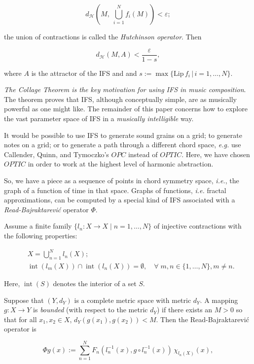 \documentclass[english,11pt,letterpaper,onecolumn]{scrartcl}
\numberwithin{equation}{section}
\newcommand{\st}{\,|\,}
\newcommand{\calH}{\mathcal{H}}
\newcommand{\Int}{\mathop{\mathrm{int}}}
\newcommand{\be}{\begin{equation}}
\newcommand{\ee}{\end{equation}}
\begin{document}
\be\label{hutchop}
d_\calH \left(M, \;\bigcup_{i=1}^N f_i (M) \right) < \varepsilon;
\ee

\noindent the union of contractions is called the \textit{Hutchinson operator}.
Then

\[
d_\calH (M, A) < \frac{\varepsilon}{1-s},
\]

\noindent where $A$ is the attractor of the IFS and  and $s :=
\max\{\mathrm{Lip}\,f_i\st
i = 1, \ldots, N\}$.

\textit{The Collage Theorem is the key motivation for using IFS in music
composition}. The theorem proves that IFS, although conceptually simple, are as
musically powerful as one might like. The remainder of this paper concerns how
to explore the vast parameter space of IFS in a \textit{musically intelligible}
way.

It would be possible to use IFS to generate sound grains on a grid; to generate
notes on a grid; or to generate a path through a different chord space,
\textit{e.g.} use Callender, Quinn, and Tymoczko's $OPC$ instead of $OPTIC$.
Here, we have chosen $OPTIC$ in order to work at the highest level of harmonic
abstraction.

So, we have a piece as a sequence of points in chord symmetry space,
\textit{i.e.}, the graph of a function of time in that space. Graphs of
functions, \textit{i.e.} fractal approximations, can be computed by a special
kind of IFS associated with a \textit{Read-Bajraktarevi\'c} operator $\Phi$.

Assume a finite family $\{l_n : X\to X \mid n = 1, \ldots, N\}$ of injective
contractions with the following properties:

\begin{align}
&X = \bigcup_{n=1}^N l_n(X);\label{union}\\
&\Int (l_m(X))\cap \Int(l_n(X)) = \emptyset, \quad\forall\;m, n\in \{1,\ldots,
N\}, m\neq n.
\end{align}

\noindent Here, $\Int (S)$ denotes the interior of a set $S$.

Suppose that $(Y,d_Y)$ is a complete metric space with metric $d_Y$. A mapping
$g:X\to Y$ is \emph{bounded} (with respect to the metric $d_Y$) if
there exists an $M > 0$ so that for all $x_1, x_2\in X$, $d_Y(g(x_1),g(x_2)) <
M$. Then the Read-Bajraktarevi\'c operator is

\be\label{RB}
\Phi g (x) := \sum\limits_{n=1}^N F_n (l_n^{-1} (x), g\circ l_n^{-1}
(x))\,\chi_{l_n(X)}(x),
\ee
\end{document}
